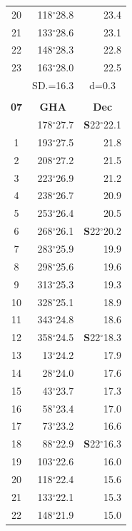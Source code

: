 \documentclass[10pt, a4paper]{report}
\begin{document}
\begin{scriptsize}
\begin{tabular*}{0.2\textwidth}[t]{@{\extracolsep{\fill}}|c|rr|}
20 & 118$^\circ$28.8 & 23.4\\
21 & 133$^\circ$28.6 & \raisebox{0.24ex}{\boldmath$\cdot$~\boldmath$\cdot$~~}23.1\\
22 & 148$^\circ$28.3 & 22.8\\
23 & 163$^\circ$28.0 & 22.5\\
\hline
\rule{0pt}{2.4ex} & \multicolumn{1}{c}{SD.=16.3} & \multicolumn{1}{c|}{d=0.3}\\
\hline
\multicolumn{1}{c}{}\\[-0.5ex]\hline
\multicolumn{1}{|c|}{\rule{0pt}{2.6ex}\textbf{07}} & \multicolumn{1}{c}{\textbf{GHA}} & \multicolumn{1}{c|}{\textbf{Dec}}\\
\hline\rule{0pt}{2.6ex}\noindent
0 & 178$^\circ$27.7 & \textbf{S}22$^\circ$22.1\\
1 & 193$^\circ$27.5 & 21.8\\
2 & 208$^\circ$27.2 & 21.5\\
3 & 223$^\circ$26.9 & \raisebox{0.24ex}{\boldmath$\cdot$~\boldmath$\cdot$~~}21.2\\
4 & 238$^\circ$26.7 & 20.9\\
5 & 253$^\circ$26.4 & 20.5\\[2Pt]
6 & 268$^\circ$26.1 & \textbf{S}22$^\circ$20.2\\
7 & 283$^\circ$25.9 & 19.9\\
8 & 298$^\circ$25.6 & 19.6\\
9 & 313$^\circ$25.3 & \raisebox{0.24ex}{\boldmath$\cdot$~\boldmath$\cdot$~~}19.3\\
10 & 328$^\circ$25.1 & 18.9\\
11 & 343$^\circ$24.8 & 18.6\\[2Pt]
12 & 358$^\circ$24.5 & \textbf{S}22$^\circ$18.3\\
13 & 13$^\circ$24.2 & 17.9\\
14 & 28$^\circ$24.0 & 17.6\\
15 & 43$^\circ$23.7 & \raisebox{0.24ex}{\boldmath$\cdot$~\boldmath$\cdot$~~}17.3\\
16 & 58$^\circ$23.4 & 17.0\\
17 & 73$^\circ$23.2 & 16.6\\[2Pt]
18 & 88$^\circ$22.9 & \textbf{S}22$^\circ$16.3\\
19 & 103$^\circ$22.6 & 16.0\\
20 & 118$^\circ$22.4 & 15.6\\
21 & 133$^\circ$22.1 & \raisebox{0.24ex}{\boldmath$\cdot$~\boldmath$\cdot$~~}15.3\\
22 & 148$^\circ$21.9 & 15.0\\

\end{tabular*}
\end{scriptsize}
\end{document}

